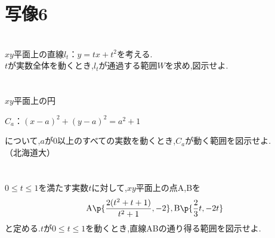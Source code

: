 \documentclass[10pt,fleqn,a4paper]{jsarticle}
\begin{document}
\section{写像6}
\noindent{}\\
$xy$平面上の直線$l_t：y=tx+t^2$を考える.\\
$t$が実数全体を動くとき,$l_t$が通過する範囲$W$を求め,図示せよ.\\\\
\\
$xy$平面上の円
\begin{center}
    $C_a：(x-a)^2+(y-a)^2=a^2+1$
\end{center}
について,$a$が0以上のすべての実数を動くとき,$C_a$が動く範囲を図示せよ.\\
\hspace{10cm}（北海道大）\\\\
\\
$0\leq t\leq1$を満たす実数$t$に対して,$xy$平面上の点A,Bを
\begin{align*}
    \mathrm{A}\p{\dfrac{2(t^2+t+1)}{t^2+1},-2},\mathrm{B}\p{\dfrac{2}{3}t,-2t}
\end{align*}
と定める.$t$が$0\leq t\leq1$を動くとき,直線ABの通り得る範囲を図示せよ.
\end{document}
